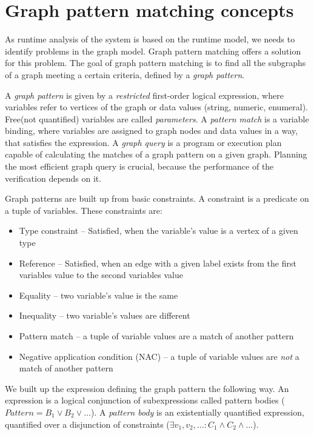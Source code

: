 \section{Graph pattern matching concepts}

As runtime analysis of the system is based on the runtime model, we needs to identify problems in the graph model. 
Graph pattern matching offers a solution for this problem. 
The goal of graph pattern matching is to find all the subgraphs of a graph meeting a certain criteria, defined by a \emph{graph pattern}.

A \emph{graph pattern} is given by a \emph{restricted} first-order logical expression, where variables refer to vertices of the graph or data values (string, numeric, enumeral).
Free(not quantified) variables are called \emph{parameters}.  
A \emph{pattern match} is a variable binding, where variables are assigned to graph nodes and data values in a way, that satisfies the expression.
A \emph{graph query} is a program or execution plan capable of calculating the matches of a graph pattern on a given graph. 
Planning the most efficient graph query is crucial, because the performance of the verification depends on it.

Graph patterns are built up from basic constraints. 
A constraint is a predicate on a tuple of variables. 
These constraints are: 

\begin{itemize}
	\item Type constraint -- Satisfied, when the variable's value is a vertex of a given type
	\item Reference -- Satisfied, when an edge with a given label exists from the first variables value to the second variables value
	\item Equality -- two variable's value is the same
	\item Inequality -- two variable's values are different
	\item Pattern match -- a tuple of variable values are a match of another pattern
	\item Negative application condition (NAC) -- a tuple of variable values are \emph{not} a match of another pattern
\end{itemize}


We built up the expression defining the graph pattern the following way. 
An expression is a logical conjunction of subexpressions called pattern bodies ($Pattern = B_1 \vee B_2 \vee \dots$). 
A \emph{pattern body} is an existentially quantified expression, quantified over a disjunction of constraints ($\exists{} v_1, v_2, \dots : C_1 \wedge{} C_2 \wedge \dots$).

